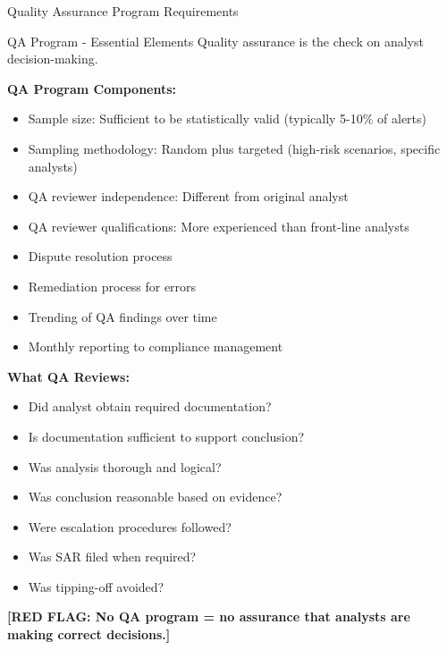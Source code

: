 \documentclass[11pt,a4paper]{beamer}
\newcommand{\redflag}[1]{\textcolor{red!80!black}{\textbf{[RED FLAG: #1]}}}
\begin{document}
	\begin{frame}{Quality Assurance Program Requirements}
		\begin{block}{QA Program - Essential Elements}
			Quality assurance is the check on analyst decision-making.
		\end{block}
		\textbf{QA Program Components:}
		\begin{itemize}
			\item Sample size: Sufficient to be statistically valid (typically 5-10\% of alerts)
			\item Sampling methodology: Random plus targeted (high-risk scenarios, specific analysts)
			\item QA reviewer independence: Different from original analyst
			\item QA reviewer qualifications: More experienced than front-line analysts
			\item Dispute resolution process
			\item Remediation process for errors
			\item Trending of QA findings over time
			\item Monthly reporting to compliance management
		\end{itemize}
		\textbf{What QA Reviews:}
		\begin{itemize}
			\item Did analyst obtain required documentation?
			\item Is documentation sufficient to support conclusion?
			\item Was analysis thorough and logical?
			\item Was conclusion reasonable based on evidence?
			\item Were escalation procedures followed?
			\item Was SAR filed when required?
			\item Was tipping-off avoided?
		\end{itemize}
		\redflag{No QA program = no assurance that analysts are making correct decisions.}
	\end{frame}
	
	
\end{document}
